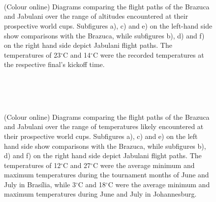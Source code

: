 \documentclass[a4paper]{article}
\begin{document}
%
%
\begin{figure}[p!] 
  \begin{center} 
  \captionsetup[subfigure]{width=0.42\textwidth}
  \,\,
   \\
  \,\,
  \\
  \,\,
 \end{center}
\vspace{-0.5cm}
 \caption{(Colour online) Diagrams comparing the flight paths of the Brazuca and Jabulani over the range of altitudes encountered at their prospective world cups.  Subfigures a), c) and e) on the left-hand side show comparisons with the Brazuca, while subfigures b), d) and f) on the right hand side depict Jabulani flight paths.  The temperatures of 23$^{\circ}$C and 14$^{\circ}$C were the recorded temperatures at the respective final's kickoff time.}
 \label{fig:AltComp}
\end{figure}
%
%
\begin{figure}[p!] 
  \begin{center} 
  \captionsetup[subfigure]{width=0.42\textwidth}
  \,\,
   \\
  \,\,
  \\
  \,\,
 \end{center}
\vspace{-0.5cm}
 \caption{(Colour online) Diagrams comparing the flight paths of the Brazuca and Jabulani over the range of temperatures likely encountered at their prospective world cups.  Subfigures a), c) and e) on the left hand side show comparisons with the Brazuca, while subfigures b), d) and f) on the right hand side depict Jabulani flight paths.  The temperatures of 12$^{\circ}$C and 27$^{\circ}$C were the average minimum and maximum temperatures during the tournament months of June and July in Bras\'ilia, while 3$^{\circ}$C and 18$^{\circ}$C were the average minimum and maximum temperatures during June and July in Johannesburg.}
 \label{fig:TempComp}
\end{figure}
\end{document}
